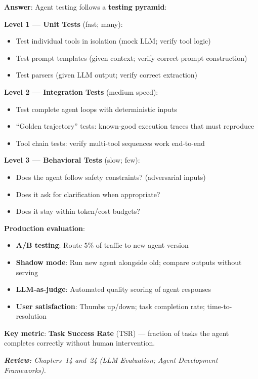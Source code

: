 \begin{questionbox}
\textbf{Answer}: Agent testing follows a \textbf{testing pyramid}:

\textbf{Level 1 --- Unit Tests} (fast; many):

\begin{itemize}
  \item Test individual tools in isolation (mock LLM; verify tool logic)
  \item Test prompt templates (given context; verify correct prompt construction)
  \item Test parsers (given LLM output; verify correct extraction)
\end{itemize}

\textbf{Level 2 --- Integration Tests} (medium speed):

\begin{itemize}
  \item Test complete agent loops with deterministic inputs
  \item ``Golden trajectory'' tests: known-good execution traces that must reproduce
  \item Tool chain tests: verify multi-tool sequences work end-to-end
\end{itemize}

\textbf{Level 3 --- Behavioral Tests} (slow; few):

\begin{itemize}
  \item Does the agent follow safety constraints? (adversarial inputs)
  \item Does it ask for clarification when appropriate?
  \item Does it stay within token/cost budgets?
\end{itemize}

\textbf{Production evaluation}:

\begin{itemize}
  \item \textbf{A/B testing}: Route 5\% of traffic to new agent version
  \item \textbf{Shadow mode}: Run new agent alongside old; compare outputs without serving
  \item \textbf{LLM-as-judge}: Automated quality scoring of agent responses
  \item \textbf{User satisfaction}: Thumbs up/down; task completion rate; time-to-resolution
\end{itemize}

\textbf{Key metric}: \textbf{Task Success Rate} (TSR) --- fraction of tasks the agent completes correctly without human intervention.

\emph{\textbf{Review:} Chapters~14 and~24 (LLM Evaluation; Agent Development Frameworks).}
\end{questionbox}

